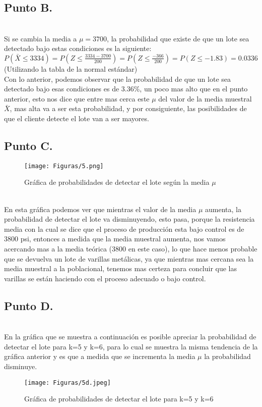 \documentclass[letterpaper,12pt,onecolumn,titlepage]{article}
\begin{document}
\subsection{Punto B.}
~\\ Si se cambia la media a $\mu=3700$, la probabilidad que existe de que un lote sea detectado bajo estas condiciones es la siguiente:
~\\ $P(\bar{X}\leq3334)=P(Z\leq\frac{3334-3700}{200})=P(Z\leq\frac{-366}{200})=P(Z\leq-1.83)=0.0336$ (Utilizando la tabla de la normal est\'{a}ndar)
~\\ Con lo anterior, podemos observar que la probabilidad de que un lote sea detectado bajo esas condiciones es de 3.36\%, un poco mas alto que en el punto anterior, esto nos dice que entre mas cerca este $\mu$ del valor de la media muestral $\bar{X}$, mas alta va a ser esta probabilidad, y por consiguiente, las posibilidades de que el cliente detecte el lote van a ser mayores.
\pagebreak \subsection{Punto C.}
\begin{figure}[!h]
    \begin{center}
        \texttt{[image: Figuras/5.png]}
        \caption{Gr\'{a}fica de probabilidades de detectar el lote seg\'{u}n la media $\mu$}
        \label{fig:Densidad}
    \end{center}
\end{figure}
~\\ En esta gr\'{a}fica podemos ver que mientras el valor de la media $\mu$ aumenta, la probabilidad de detectar el lote va disminuyendo, esto pasa, porque la resistencia media con la cual se dice que el proceso de producci\'{o}n esta bajo control es de 3800 psi, entonces a medida que la media muestral aumenta, nos vamos acercando mas a la media te\'{o}rica (3800 en este caso), lo que hace menos probable que se devuelva un lote de varillas met\'{a}licas, ya que mientras mas cercana sea la media muestral a la poblacional, tenemos mas certeza para concluir que las varillas se est\'{a}n haciendo con el proceso adecuado o bajo control.

\pagebreak \subsection{Punto D.}
~\\ En la gr\'{a}fica que se muestra a continuaci\'{o}n es posible apreciar la probabilidad de detectar el lote para k=5 y k=6, para lo cual se muestra la misma tendencia de la gr\'{a}fica anterior y es que a medida que se incrementa la media $\mu$ la probabilidad disminuye.
\begin{figure}[!h]
    \begin{center}
        \texttt{[image: Figuras/5d.jpeg]}
        \caption{Gr\'{a}fica de probabilidades de detectar el lote para k=5 y k=6}
        \label{fig:Densidad}
    \end{center}
\end{figure}
\end{document}
